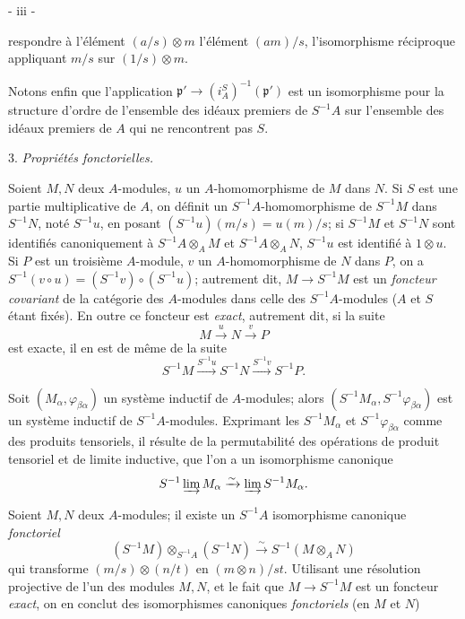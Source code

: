 \begin{center}
- iii -
\end{center}

respondre à l'élément $(a/s) \otimes m$ l'élément $(am)/s$, l'isomorphisme réciproque appliquant $m/s$ sur $(1/s) \otimes m$.

Notons enfin que l'application $\mathfrak{p}' \to (i_A^S)^{-1}(\mathfrak{p}')$ est un isomorphisme pour la structure d'ordre de l'ensemble des idéaux premiers de $S^{-1}A$ sur l'ensemble des idéaux premiers de $A$ qui ne rencontrent pas $S$.

3. \emph{Propriétés fonctorielles.}

Soient $M, N$ deux $A$-modules, $u$ un $A$-homomorphisme de $M$ dans $N$. Si $S$ est une partie multiplicative de $A$, on définit un $S^{-1}A$-homomorphisme de $S^{-1}M$ dans $S^{-1}N$, noté $S^{-1}u$, en posant $(S^{-1}u)(m/s) = u(m)/s$; si $S^{-1}M$ et $S^{-1}N$ sont identifiés canoniquement à $S^{-1}A \otimes_A M$ et $S^{-1}A \otimes_A N$, $S^{-1}u$ est identifié à $1 \otimes u$. Si $P$ est un troisième $A$-module, $v$ un $A$-homomorphisme de $N$ dans $P$, on a $S^{-1}(v \circ u) = (S^{-1}v) \circ (S^{-1}u)$; autrement dit, $M \to S^{-1}M$ est un \emph{foncteur covariant} de la catégorie des $A$-modules dans celle des $S^{-1}A$-modules ($A$ et $S$ étant fixés). En outre ce foncteur est \emph{exact}, autrement dit, si la suite
$$ M \xrightarrow{u} N \xrightarrow{v} P $$
est exacte, il en est de même de la suite
$$ S^{-1}M \xrightarrow{S^{-1}u} S^{-1}N \xrightarrow{S^{-1}v} S^{-1}P . $$

Soit $(M_\alpha, \varphi_{\beta\alpha})$ un système inductif de $A$-modules; alors $(S^{-1}M_\alpha, S^{-1}\varphi_{\beta\alpha})$ est un système inductif de $S^{-1}A$-modules. Exprimant les $S^{-1}M_\alpha$ et $S^{-1}\varphi_{\beta\alpha}$ comme des produits tensoriels, il résulte de la permutabilité des opérations de produit tensoriel et de limite inductive, que l'on a un isomorphisme canonique
$$ S^{-1} \varinjlim M_\alpha \xrightarrow{\sim} \varinjlim S^{-1} M_\alpha . $$

Soient $M, N$ deux $A$-modules; il existe un $S^{-1}A$ isomorphisme canonique \emph{fonctoriel}
$$ (S^{-1}M) \otimes_{S^{-1}A} (S^{-1}N) \xrightarrow{\sim} S^{-1}(M \otimes_A N) $$
qui transforme $(m/s) \otimes (n/t)$ en $(m \otimes n)/st$. Utilisant une résolution projective de l'un des modules $M, N$, et le fait que $M \to S^{-1}M$ est un foncteur \emph{exact}, on en conclut des isomorphismes canoniques \emph{fonctoriels} (en $M$ et $N$)

